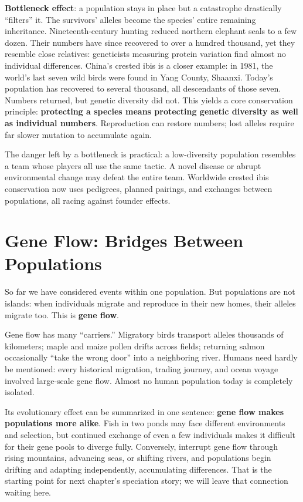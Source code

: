 \textbf{Bottleneck effect}: a population stays in place but a catastrophe drastically ``filters'' it. The survivors' alleles become the species' entire remaining inheritance. Nineteenth-century hunting reduced northern elephant seals to a few dozen. Their numbers have since recovered to over a hundred thousand, yet they resemble close relatives: geneticists measuring protein variation find almost no individual differences. China's crested ibis is a closer example: in 1981, the world's last seven wild birds were found in Yang County, Shaanxi. Today's population has recovered to several thousand, all descendants of those seven. Numbers returned, but genetic diversity did not. This yields a core conservation principle: \textbf{protecting a species means protecting genetic diversity as well as individual numbers}. Reproduction can restore numbers; lost alleles require far slower mutation to accumulate again.

The danger left by a bottleneck is practical: a low-diversity population resembles a team whose players all use the same tactic. A novel disease or abrupt environmental change may defeat the entire team. Worldwide crested ibis conservation now uses pedigrees, planned pairings, and exchanges between populations, all racing against founder effects.

\section{Gene Flow: Bridges Between Populations}

So far we have considered events within one population. But populations are not islands: when individuals migrate and reproduce in their new homes, their alleles migrate too. This is \textbf{gene flow}.

Gene flow has many ``carriers.'' Migratory birds transport alleles thousands of kilometers; maple and maize pollen drifts across fields; returning salmon occasionally ``take the wrong door'' into a neighboring river. Humans need hardly be mentioned: every historical migration, trading journey, and ocean voyage involved large-scale gene flow. Almost no human population today is completely isolated.

Its evolutionary effect can be summarized in one sentence: \textbf{gene flow makes populations more alike}. Fish in two ponds may face different environments and selection, but continued exchange of even a few individuals makes it difficult for their gene pools to diverge fully. Conversely, interrupt gene flow through rising mountains, advancing seas, or shifting rivers, and populations begin drifting and adapting independently, accumulating differences. That is the starting point for next chapter's speciation story; we will leave that connection waiting here.

